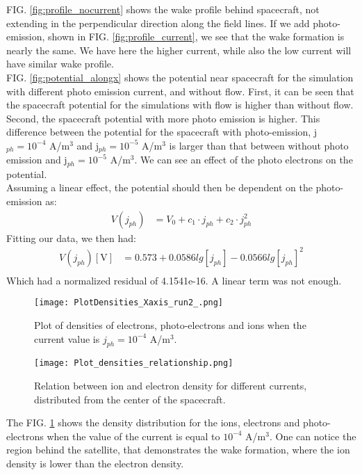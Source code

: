 \documentclass[aip, 
rsi, 
amsmath,
amssymb,
longbibliography,
preprint]{revtex4-1}
\begin{document}
FIG. \ref{fig:profile_nocurrent} shows the wake profile behind spacecraft, not extending in the perpendicular direction along the field lines. If we add photo-emission,  shown in FIG. \ref{fig:profile_current}, we see that the wake formation is nearly the same. We have here the higher current, while also the low current will have similar wake profile.\\

FIG. \ref{fig:potential_alongx} shows the potential near spacecraft for the simulation with different photo emission current, and without flow. First, it can be seen that the spacecraft potential for the simulations with flow is higher than without flow. Second, the spacecraft potential with more photo emission is higher. This difference between the potential for the spacecraft  with photo-emission, j$_{ph} = 10^{-4}$ A/m$^3$ and  j$_{ph} = 10^{-5}$ A/m$^3$ is larger than that between without photo emission and  j$_{ph} = 10^{-5}$ A/m$^3$. We can see an effect of the photo electrons on the potential.\\

Assuming a linear effect, the potential should then be dependent on the photo-emission as:
\begin{align*}
V\left(j_{ph}\right) &= V_0 + c_1\cdot j_{ph} + c_2\cdot j_{ph}^2
\end{align*}
Fitting our data, we then had:
\begin{align*}
V\left(j_{ph}\right) \left[\text{V}\right]&= 0.573 + 0.0586 lg\left[j_{ph}\right] - 0.0566 lg\left[j_{ph}\right]^2\\
\end{align*}
Which had a normalized residual of 4.1541e-16. A linear term was not enough.\\

\begin{figure}
\texttt{[image: PlotDensities\_Xaxis\_run2\_.png]}
\caption{\label{fig:densityCurrent}Plot of densities of electrons, photo-electrons and ions when the current value is \(j_{ph} = 10^{-4}\) A/m$^3$.}
\end{figure}

\begin{figure}
\texttt{[image: Plot\_densities\_relationship.png]}
\caption{\label{fig:densityCurrentRelation}Relation between ion and electron density for different currents, distributed from the center of the spacecraft.}
\end{figure}

The FIG. \ref{fig:densityCurrent} shows the density distribution for the ions, electrons and photo-electrons when the value of the current is equal to $10^{-4}$ A/m$^3$. One can notice the region behind the satellite, that demonstrates the wake formation, where the ion density is lower than the electron density.\par
\end{document}
